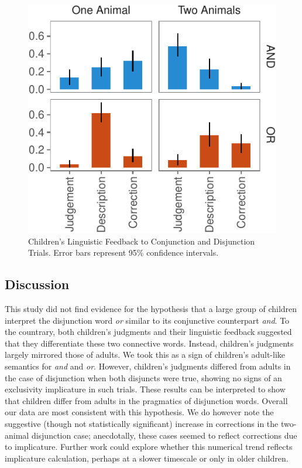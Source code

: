\documentclass[10pt, letterpaper]{article}
\newenvironment{CodeChunk}{}{}
\begin{document}
\begin{CodeChunk}
\begin{figure}[h]

{\centering \includegraphics{figs/feedback_data-1} 

}

\caption[Children's Linguistic Feedback to Conjunction and Disjunction Trials]{Children's Linguistic Feedback to Conjunction and Disjunction Trials. Error bars represent 95\% confidence intervals.}\label{fig:feedback_data}
\end{figure}
\end{CodeChunk}

\subsection{Discussion}\label{discussion-1}

This study did not find evidence for the hypothesis that a large group
of children interpret the disjunction word \emph{or} similar to its
conjunctive counterpart \emph{and}. To the countrary, both children's
judgments and their linguistic feedback suggested that they
differentiate these two connective words. Instead, children's judgments
largely mirrored those of adults. We took this as a sign of children's
adult-like semantics for \emph{and} and \emph{or}. However, children's
judgments differed from adults in the case of disjunction when both
disjuncts were true, showing no signs of an exclusivity implicature in
such trials. These results can be interpreted to show that children
differ from adults in the pragmatics of disjunction words. Overall our
data are most consistent with this hypothesis. We do however note the
suggestive (though not statistically significant) increase in
corrections in the two-animal disjunction case; anecdotally, these cases
seemed to reflect corrections due to implicature. Further work could
explore whether this numerical trend reflects implicature calculation,
perhaps at a slower timescale or only in older children.
\end{document}
